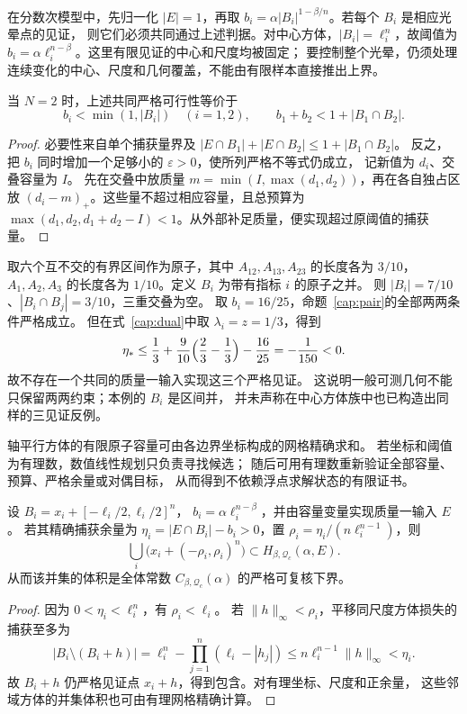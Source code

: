 在分数次模型中，先归一化 $|E|=1$，再取
$b_i=\alpha |B_i|^{1-\beta/n}$。若每个 $B_i$ 是相应光晕点的见证，
则它们必须共同通过上述判据。对中心方体，$|B_i|=\ell_i^n$，故阈值为
$b_i=\alpha\ell_i^{n-\beta}$。这里有限见证的中心和尺度均被固定；
要控制整个光晕，仍须处理连续变化的中心、尺度和几何覆盖，不能由有限样本直接推出上界。

\begin{proposition}[两个见证的完整判据]\label{cap:pair}
当 $N=2$ 时，上述共同严格可行性等价于
\[
 b_i<\min(1,|B_i|)\quad(i=1,2),\qquad
 b_1+b_2<1+|B_1\cap B_2|.
\]
\end{proposition}
\begin{proof}
必要性来自单个捕获量界及
$|E\cap B_1|+|E\cap B_2|\le1+|B_1\cap B_2|$。
反之，把 $b_i$ 同时增加一个足够小的 $\varepsilon>0$，使所列严格不等式仍成立，
记新值为 $d_i$、交叠容量为 $I$。
先在交叠中放质量 $m=\min(I,\max(d_1,d_2))$，再在各自独占区放
$(d_i-m)_+$。这些量不超过相应容量，且总预算为
$\max(d_1,d_2,d_1+d_2-I)<1$。从外部补足质量，便实现超过原阈值的捕获量。
\end{proof}

\begin{example}[一般可测几何中两两可行仍不够]\label{cap:triple}
取六个互不交的有界区间作为原子，其中 $A_{12},A_{13},A_{23}$ 的长度各为 $3/10$，
$A_1,A_2,A_3$ 的长度各为 $1/10$。定义 $B_i$ 为带有指标 $i$ 的原子之并。
则 $|B_i|=7/10$、$|B_i\cap B_j|=3/10$，三重交叠为空。
取 $b_i=16/25$，命题~\ref{cap:pair}的全部两两条件严格成立。
但在式~\eqref{cap:dual}中取 $\lambda_i=z=1/3$，得到
\[
 \eta_*\le \frac13+\frac9{10}\Bigl(\frac23-\frac13\Bigr)-\frac{16}{25}
 =-\frac1{150}<0.
\]
故不存在一个共同的质量一输入实现这三个严格见证。
这说明一般可测几何不能只保留两两约束；本例的 $B_i$ 是区间并，
并未声称在中心方体族中也已构造出同样的三见证反例。
\end{example}

轴平行方体的有限原子容量可由各边界坐标构成的网格精确求和。
若坐标和阈值为有理数，数值线性规划只负责寻找候选；
随后可用有理数重新验证全部容量、预算、严格余量或对偶目标，
从而得到不依赖浮点求解状态的有限证书。

\begin{proposition}[有限可行证书到连续光晕的下界]\label{cap:neighbourhood}
设 $B_i=x_i+[-\ell_i/2,\ell_i/2]^n$，
$b_i=\alpha\ell_i^{n-\beta}$，并由容量变量实现质量一输入 $E$。
若其精确捕获余量为 $\eta_i=|E\cap B_i|-b_i>0$，置
$\rho_i=\eta_i/(n\ell_i^{n-1})$，则
\[
 \bigcup_i\bigl(x_i+(-\rho_i,\rho_i)^n\bigr)
 \subset H_{\beta,\mathcal Q_c}(\alpha,E).
\]
从而该并集的体积是全体常数 $C_{\beta,\mathcal Q_c}(\alpha)$ 的严格可复核下界。
\end{proposition}
\begin{proof}
因为 $0<\eta_i<\ell_i^n$，有 $\rho_i<\ell_i$。
若 $\|h\|_\infty<\rho_i$，平移同尺度方体损失的捕获至多为
\[
 |B_i\setminus(B_i+h)|
 =\ell_i^n-\prod_{j=1}^n(\ell_i-|h_j|)
 \le n\ell_i^{n-1}\|h\|_\infty<\eta_i.
\]
故 $B_i+h$ 仍严格见证点 $x_i+h$，得到包含。对有理坐标、尺度和正余量，
这些邻域方体的并集体积也可由有理网格精确计算。
\end{proof}

